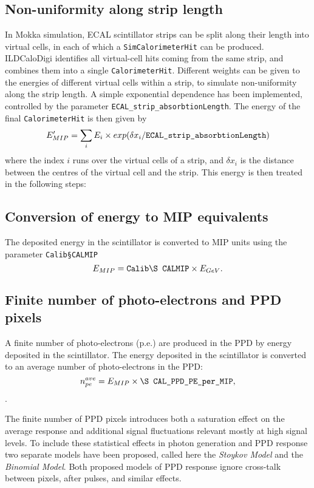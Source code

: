 \documentclass[12pt]{article} %
\begin{document}
\subsection*{Non-uniformity along strip length}
In Mokka simulation, ECAL scintillator strips can be split along their length into virtual cells,
in each of which a {\tt SimCalorimeterHit} can be produced.
ILDCaloDigi identifies all virtual-cell hits coming from the same strip, and combines them into a single {\tt CalorimeterHit}.
Different weights can be given to the energies of different virtual cells within a strip, to simulate non-uniformity
along the strip length. A simple exponential dependence has been implemented, controlled by the parameter
{\tt ECAL\_strip\_absorbtionLength}. The energy of the final {\tt CalorimeterHit} is then given by
\begin{equation*}
E'_{MIP} = \sum_{i} E_{i} \times exp( \delta x_i / \text{\tt ECAL\_strip\_absorbtionLength} )
\end{equation*}
where the index $i$ runs over the virtual cells of a strip, and $\delta x_i$ is the distance between the
centres of the virtual cell and the strip. This energy is then treated in the following steps:

\subsection*{Conversion of energy to MIP equivalents}
The deposited energy in the scintillator is converted to MIP units using the parameter {\tt Calib\S CALMIP}
\begin{equation*}
E_{MIP} = \text{\tt Calib\S CALMIP} \times E_{GeV} .
\end{equation*}

\subsection*{Finite number of photo-electrons and PPD pixels}
A finite number of photo-electrons (p.e.) are produced in the PPD by energy deposited in the scintillator.
The energy deposited in the scintillator is converted to an average number of photo-electrons in the PPD:
\begin{equation*}
n_{pe}^{ave} = E_{MIP} \times \text{\tt \S CAL\_PPD\_PE\_per\_MIP},
\end{equation*}.

The finite number of PPD pixels introduces both a saturation effect on the average response and additional signal fluctuations relevant mostly at high signal levels.
To include these statistical effects in photon generation and PPD response two separate models have been proposed, called here the \emph{Stoykov Model} and the \emph{Binomial Model}. Both proposed models of PPD response ignore cross-talk between pixels, after pulses, and similar effects.
\end{document}
